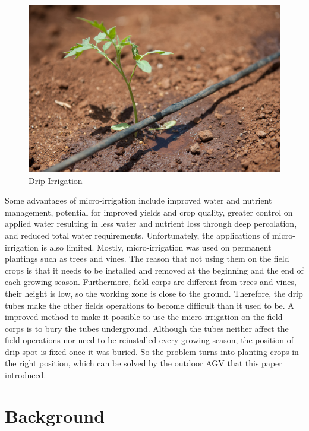 \documentclass[12pt]{article}
\begin{document}
\begin{flushleft}
\begin{figure}[ht!]
	\begin{center}
		\includegraphics[scale = 0.25]{drip.jpg}
		\caption{Drip Irrigation}
	\end{center}
\end{figure}
Some advantages of micro-irrigation include improved water and nutrient management, potential for improved yields and crop quality, greater control on applied water resulting in less water and nutrient loss through deep percolation, and reduced total water requirements. \cite{phene1986advantages} Unfortunately, the applications of micro-irrigation is also limited. Mostly, micro-irrigation was used on permanent plantings such as trees and vines. The reason that not using them on the field crops is that it needs to be installed and removed at the beginning and the end of each growing season. Furthermore, field corps are different from trees and vines, their height is low, so the working zone is close to the ground. Therefore, the drip tubes make the other fields operations to become difficult than it used to be. A improved method to make it possible to use the micro-irrigation on the field corps is to bury the tubes underground. \cite{camp1998subsurface} Although the tubes neither affect the field operations nor need to be reinstalled every growing season, the position of drip spot is fixed once it was buried. So the problem turns into planting crops in the right position, which can be solved by the outdoor AGV that this paper introduced. 


\section{Background}


\end{flushleft}
\end{document}
